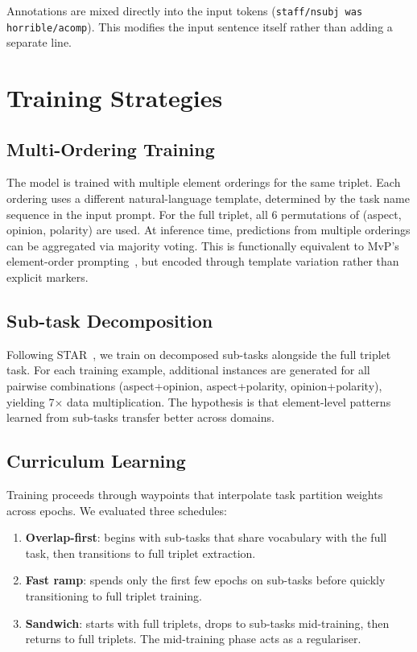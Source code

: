 \documentclass[12pt,a4paper]{report}
\begin{document}
Annotations are mixed directly into the input tokens (\texttt{staff/nsubj was horrible/acomp}). This modifies the input sentence itself rather than adding a separate line.


\section{Training Strategies}\label{sec:training-strategies}

\subsection{Multi-Ordering Training}

The model is trained with multiple element orderings for the same triplet. Each ordering uses a different natural-language template, determined by the task name sequence in the input prompt. For the full triplet, all 6 permutations of (aspect, opinion, polarity) are used. At inference time, predictions from multiple orderings can be aggregated via majority voting. This is functionally equivalent to MvP's element-order prompting~\cite{gou2023mvp}, but encoded through template variation rather than explicit markers.

\subsection{Sub-task Decomposition}

Following STAR~\cite{xie2025star}, we train on decomposed sub-tasks alongside the full triplet task. For each training example, additional instances are generated for all pairwise combinations (aspect+opinion, aspect+polarity, opinion+polarity), yielding 7$\times$ data multiplication. The hypothesis is that element-level patterns learned from sub-tasks transfer better across domains.

\subsection{Curriculum Learning}

Training proceeds through waypoints that interpolate task partition weights across epochs. We evaluated three schedules:

\begin{enumerate}
    \item \textbf{Overlap-first}: begins with sub-tasks that share vocabulary with the full task, then transitions to full triplet extraction.
    \item \textbf{Fast ramp}: spends only the first few epochs on sub-tasks before quickly transitioning to full triplet training.
    \item \textbf{Sandwich}: starts with full triplets, drops to sub-tasks mid-training, then returns to full triplets. The mid-training phase acts as a regulariser.
\end{enumerate}
\end{document}
